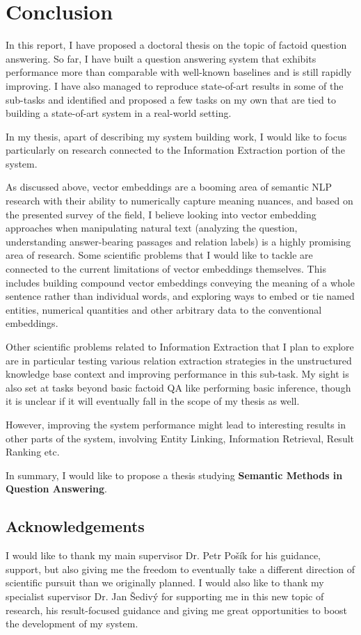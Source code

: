\chapter{Conclusion}
\label{ch:concl}

In this report, I have proposed a doctoral thesis on the topic
of factoid question answering.
So far, I have built a question answering system that exhibits
performance more than comparable with well-known baselines
and is still rapidly improving.  I have also
managed to reproduce state-of-art results in some of the sub-tasks
and identified and proposed a few tasks on my own that are tied
to building a state-of-art system in a real-world setting.

In my thesis, apart of describing my system building work, I would
like to focus particularly on research connected to the Information Extraction
portion of the system.

As discussed above, vector embeddings are a booming area of semantic
NLP research with their ability to numerically capture meaning nuances,
and based on the presented survey of the field, I believe looking into
vector embedding approaches when manipulating natural text
(analyzing the question, understanding answer-bearing
passages and relation labels) is a highly promising area of research.
Some scientific problems that I would like to tackle are connected
to the current limitations of vector embeddings themselves.
This includes building compound vector embeddings conveying
the meaning of a whole sentence rather than individual words,
and
exploring ways to embed or tie named entities, numerical quantities
and other arbitrary data to the conventional embeddings.

Other scientific problems related to Information Extraction that
I plan to explore are in particular testing various relation
extraction strategies in the unstructured knowledge base context
and improving performance in this sub-task.
My sight is also set at tasks beyond basic factoid QA like performing basic inference,
though it is unclear if it will eventually fall in the scope of my
thesis as well.

However, improving the system performance might lead to interesting
results in other parts of the system, involving Entity Linking,
Information Retrieval, Result Ranking etc.

In summary, I would like to propose a thesis studying
\textbf{Semantic Methods in Question Answering}.

\section{Acknowledgements}

I would like to thank my main supervisor Dr. Petr Pošík
for his guidance, support, but also giving me the freedom to
eventually take a different direction of scientific pursuit
than we originally planned.
I would also like to thank my specialist supervisor Dr. Jan Šedivý
for supporting me in this new topic of research, his result-focused
guidance and giving me great opportunities to boost the development
of my system.
